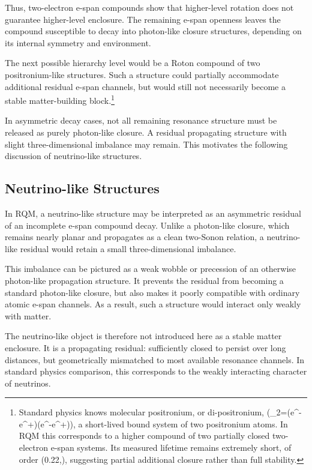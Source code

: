 \documentclass[11pt,a4paper]{article}
\begin{document}
Thus, two-electron e-span compounds show that higher-level rotation does not guarantee higher-level enclosure. The remaining e-span openness leaves the compound susceptible to decay into photon-like closure structures, depending on its internal symmetry and environment.

The next possible hierarchy level would be a Roton compound of two positronium-like structures. Such a structure could partially accommodate additional residual e-span channels, but would still not necessarily become a stable matter-building block.\footnote{Standard physics knows molecular positronium, or di-positronium, (_2=(e^-e^+)(e^-e^+)), a short-lived bound system of two positronium atoms. In RQM this corresponds to a higher compound of two partially closed two-electron e-span systems. Its measured lifetime remains extremely short, of order (0.22,), suggesting partial additional closure rather than full stability.}

In asymmetric decay cases, not all remaining resonance structure must be released as purely photon-like closure. A residual propagating structure with slight three-dimensional imbalance may remain. This motivates the following discussion of neutrino-like structures.


\subsection{Neutrino-like Structures}

In RQM, a neutrino-like structure may be interpreted as an asymmetric residual of an incomplete e-span compound decay. Unlike a photon-like closure, which remains nearly planar and propagates as a clean two-Sonon relation, a neutrino-like residual would retain a small three-dimensional imbalance.

This imbalance can be pictured as a weak wobble or precession of an otherwise photon-like propagation structure. It prevents the residual from becoming a standard photon-like closure, but also makes it poorly compatible with ordinary atomic e-span channels. As a result, such a structure would interact only weakly with matter.

The neutrino-like object is therefore not introduced here as a stable matter enclosure. It is a propagating residual: sufficiently closed to persist over long distances, but geometrically mismatched to most available resonance channels. In standard physics comparison, this corresponds to the weakly interacting character of neutrinos.
\end{document}
